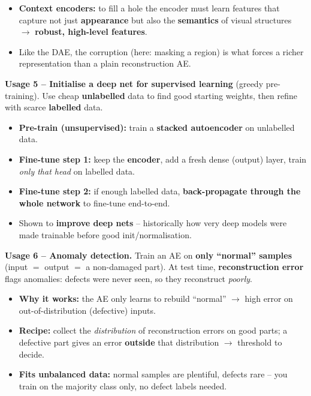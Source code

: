 \documentclass[10pt,a4paper]{article}
\begin{document}
	\begin{itemize}[leftmargin=*]
		\item \textbf{Context encoders:} to fill a hole the encoder must learn features that capture not just \textbf{appearance} but also the \textbf{semantics} of visual structures $\to$ \textbf{robust, high-level features}.
		\item Like the DAE, the corruption (here: masking a region) is what forces a richer representation than a plain reconstruction AE.
	\end{itemize}

	\begin{importantbox}
		\textbf{Usage 5 -- Initialise a deep net for supervised learning} (greedy pre-training). Use cheap \textbf{unlabelled} data to find good starting weights, then refine with scarce \textbf{labelled} data.
	\end{importantbox}

	\begin{itemize}[leftmargin=*]
		\item \textbf{Pre-train (unsupervised):} train a \textbf{stacked autoencoder} on unlabelled data.
		\item \textbf{Fine-tune step 1:} keep the \textbf{encoder}, add a fresh dense (output) layer, train \emph{only that head} on labelled data.
		\item \textbf{Fine-tune step 2:} if enough labelled data, \textbf{back-propagate through the whole network} to fine-tune end-to-end.
		\item Shown to \textbf{improve deep nets} -- historically how very deep models were made trainable before good init/normalisation.
	\end{itemize}

	\begin{importantbox}
		\textbf{Usage 6 -- Anomaly detection.} Train an AE on \textbf{only ``normal'' samples} (input $=$ output $=$ a non-damaged part). At test time, \textbf{reconstruction error} flags anomalies: defects were never seen, so they reconstruct \emph{poorly}.
	\end{importantbox}

	\begin{itemize}[leftmargin=*]
		\item \textbf{Why it works:} the AE only learns to rebuild ``normal'' $\to$ high error on out-of-distribution (defective) inputs.
		\item \textbf{Recipe:} collect the \emph{distribution} of reconstruction errors on good parts; a defective part gives an error \textbf{outside} that distribution $\to$ threshold to decide.
		\item \textbf{Fits unbalanced data:} normal samples are plentiful, defects rare -- you train on the majority class only, no defect labels needed.
	\end{itemize}
\end{document}
